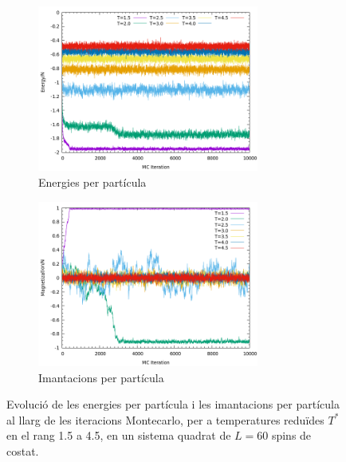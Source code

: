 \documentclass[a4paper]{article}
\begin{document}
\begin{figure}[H]
    \centering
    \begin{subfigure}{.8\textwidth}
        \centering
        \includegraphics[width=0.8\textwidth]{SIM-L-060-energy-EVO.png}
        \caption{Energies per partícula}
        \label{fig:evo_ene}
    \end{subfigure}
    \begin{subfigure}{.8\textwidth}
        \centering
        \includegraphics[width=0.8\textwidth]{SIM-L-060-magnetiz-EVO.png}
        \caption{Imantacions per partícula}
        \label{fig:evo_mag}
    \end{subfigure}
    \caption{Evolució de les energies per partícula i les imantacions per partícula al llarg de les iteracions Montecarlo, per a temperatures reduïdes $T^*$ en el rang 1.5 a 4.5, en un sistema quadrat de $L=60$ spins de costat.}
\label{fig:evo}
\end{figure}
\end{document}
